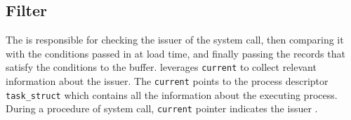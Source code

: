 







\subsection{Filter}

The \Filter is responsible for checking the issuer of the system call, then comparing it with the conditions passed in at load time, and finally passing the records that satisfy the conditions to the buffer.
\Filter leverages \texttt{current} to collect relevant information about the issuer. The \texttt{current} points to the process descriptor \texttt{task\_struct} which contains all the information about the executing process. During a procedure of system call, \texttt{current} pointer indicates the issuer \cite{corbet_linux_2005}. 



